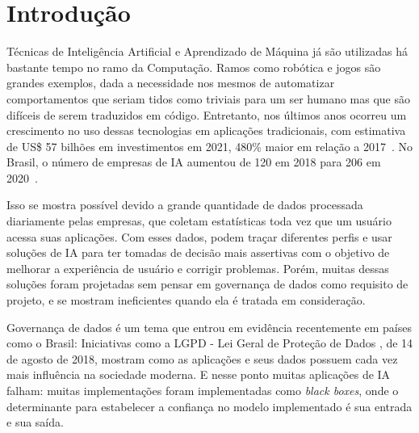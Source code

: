 \documentclass[portugues]{ic-tese}
\begin{document}


\tableofcontents


\mainmatter


\chapter{Introdução}


Técnicas de Inteligência Artificial e Aprendizado de Máquina já são utilizadas há bastante tempo no ramo da Computação. Ramos como robótica e jogos são grandes exemplos, dada a necessidade nos mesmos de automatizar comportamentos que seriam tidos como triviais para um ser humano mas que são difíceis de serem traduzidos em código. Entretanto, nos últimos anos ocorreu um crescimento no uso dessas tecnologias em aplicações tradicionais, com estimativa de US\$ 57 bilhões em investimentos em 2021, 480\% maior em relação a 2017~\citep{Deloitte_2018}. No Brasil, o número de empresas de IA aumentou de 120 em 2018 para 206 em 2020~\citep{CIO_2021}.

Isso se mostra possível devido a grande quantidade de dados processada diariamente pelas empresas, que coletam estatísticas toda vez que um usuário acessa suas aplicações. Com esses dados, podem traçar diferentes perfis e usar soluções de IA para ter tomadas de decisão mais assertivas com o objetivo de melhorar a experiência de usuário e corrigir problemas. Porém, muitas dessas soluções foram projetadas sem pensar em governança de dados como requisito de projeto, e se mostram ineficientes quando ela é tratada em consideração.

Governança de dados é um tema que entrou em evidência recentemente em países como o Brasil: Iniciativas como a LGPD - Lei Geral de Proteção de Dados \citep{LGPD_2021}, de 14 de agosto de 2018, mostram como as aplicações e seus dados possuem cada vez mais influência na sociedade moderna. E nesse ponto muitas aplicações de IA falham: muitas implementações foram implementadas como \textit{black boxes}, onde o determinante para estabelecer a confiança no modelo implementado é sua entrada e sua saída.
\end{document}
